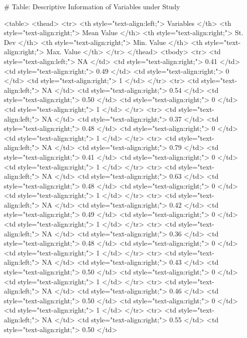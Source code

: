 # Table: Descriptive Information of Variables under Study 

<table>
 <thead>
  <tr>
   <th style="text-align:left;"> Variables </th>
   <th style="text-align:right;"> Mean Value </th>
   <th style="text-align:right;"> St. Dev </th>
   <th style="text-align:right;"> Min. Value </th>
   <th style="text-align:right;"> Max. Value </th>
  </tr>
 </thead>
<tbody>
  <tr>
   <td style="text-align:left;"> NA </td>
   <td style="text-align:right;"> 0.41 </td>
   <td style="text-align:right;"> 0.49 </td>
   <td style="text-align:right;"> 0 </td>
   <td style="text-align:right;"> 1 </td>
  </tr>
  <tr>
   <td style="text-align:left;"> NA </td>
   <td style="text-align:right;"> 0.54 </td>
   <td style="text-align:right;"> 0.50 </td>
   <td style="text-align:right;"> 0 </td>
   <td style="text-align:right;"> 1 </td>
  </tr>
  <tr>
   <td style="text-align:left;"> NA </td>
   <td style="text-align:right;"> 0.37 </td>
   <td style="text-align:right;"> 0.48 </td>
   <td style="text-align:right;"> 0 </td>
   <td style="text-align:right;"> 1 </td>
  </tr>
  <tr>
   <td style="text-align:left;"> NA </td>
   <td style="text-align:right;"> 0.79 </td>
   <td style="text-align:right;"> 0.41 </td>
   <td style="text-align:right;"> 0 </td>
   <td style="text-align:right;"> 1 </td>
  </tr>
  <tr>
   <td style="text-align:left;"> NA </td>
   <td style="text-align:right;"> 0.63 </td>
   <td style="text-align:right;"> 0.48 </td>
   <td style="text-align:right;"> 0 </td>
   <td style="text-align:right;"> 1 </td>
  </tr>
  <tr>
   <td style="text-align:left;"> NA </td>
   <td style="text-align:right;"> 0.42 </td>
   <td style="text-align:right;"> 0.49 </td>
   <td style="text-align:right;"> 0 </td>
   <td style="text-align:right;"> 1 </td>
  </tr>
  <tr>
   <td style="text-align:left;"> NA </td>
   <td style="text-align:right;"> 0.36 </td>
   <td style="text-align:right;"> 0.48 </td>
   <td style="text-align:right;"> 0 </td>
   <td style="text-align:right;"> 1 </td>
  </tr>
  <tr>
   <td style="text-align:left;"> NA </td>
   <td style="text-align:right;"> 0.43 </td>
   <td style="text-align:right;"> 0.50 </td>
   <td style="text-align:right;"> 0 </td>
   <td style="text-align:right;"> 1 </td>
  </tr>
  <tr>
   <td style="text-align:left;"> NA </td>
   <td style="text-align:right;"> 0.46 </td>
   <td style="text-align:right;"> 0.50 </td>
   <td style="text-align:right;"> 0 </td>
   <td style="text-align:right;"> 1 </td>
  </tr>
  <tr>
   <td style="text-align:left;"> NA </td>
   <td style="text-align:right;"> 0.55 </td>
   <td style="text-align:right;"> 0.50 </td>
